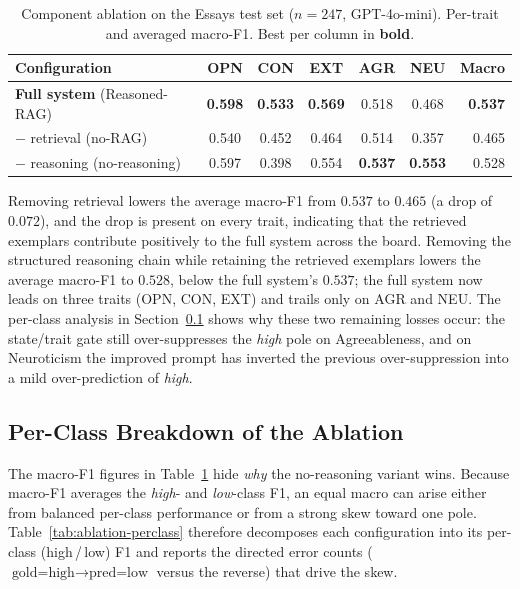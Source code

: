 \documentclass[../main.tex]{subfiles}
\begin{document}
\begin{table}[htbp]
  \centering
  \caption{Component ablation on the Essays test set ($n=247$, GPT-4o-mini).
    Per-trait and averaged macro-F1. Best per column in \textbf{bold}.}
  \label{tab:pipeline-ablation}
  \small
  \begin{tabular}{lcccccr}
    \toprule
    \textbf{Configuration} & \textbf{OPN} & \textbf{CON} & \textbf{EXT}
      & \textbf{AGR} & \textbf{NEU} & \textbf{Macro} \\
    \midrule
    \textbf{Full system} (Reasoned-RAG)  & \textbf{0.598} & \textbf{0.533} & \textbf{0.569} & 0.518 & 0.468 & \textbf{0.537} \\
    \quad $-$ retrieval (no-RAG)          & 0.540 & 0.452 & 0.464 & 0.514 & 0.357 & 0.465 \\
    \quad $-$ reasoning (no-reasoning)    & 0.597 & 0.398 & 0.554 & \textbf{0.537} & \textbf{0.553} & 0.528 \\
    \bottomrule
  \end{tabular}
\end{table}

Removing retrieval lowers the average macro-F1 from $0.537$ to $0.465$ (a drop
of $0.072$), and the drop is present on every trait, indicating that the
retrieved exemplars contribute positively to the full system across the board.
Removing the structured reasoning chain while retaining the retrieved exemplars
lowers the average macro-F1 to $0.528$, below the full system's $0.537$; the
full system now leads on three traits (OPN, CON, EXT) and trails only on AGR and
NEU. The per-class analysis in Section~\ref{sec:ablation-perclass} shows why
these two remaining losses occur: the state/trait gate still over-suppresses the
\textit{high} pole on Agreeableness, and on Neuroticism the improved prompt has
inverted the previous over-suppression into a mild over-prediction of
\textit{high}.

\subsection{Per-Class Breakdown of the Ablation}
\label{sec:ablation-perclass}

The macro-F1 figures in Table~\ref{tab:pipeline-ablation} hide \emph{why} the
no-reasoning variant wins. Because macro-F1 averages the \textit{high}- and
\textit{low}-class F1, an equal macro can arise either from balanced per-class
performance or from a strong skew toward one pole. Table~\ref{tab:ablation-perclass}
therefore decomposes each configuration into its per-class (high\,/\,low) F1
and reports the directed error counts ($\text{gold=high}\rightarrow\text{pred=low}$
versus the reverse) that drive the skew.
\end{document}
